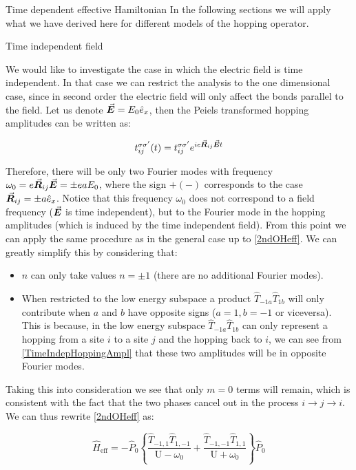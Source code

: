 \begin{section}{Time dependent effective Hamiltonian}
In the following sections we will apply what we have derived here for different models of the hopping operator.

\begin{subsection}{Time independent field}

We would like to investigate the case in which the electric field is time independent. In that case we can restrict the analysis to the one dimensional case, since in second order the electric field will only affect the bonds parallel to the field. Let us denote $\vec{\boldsymbol{E}} = E_0 \hat{e}_x$, then the Peiels transformed hopping amplitudes can be written as:

\begin{equation}
\label{TimeIndepHoppingAmpl}
t_{ij}^{\sigma \sigma'} (t) = t_{ij}^{\sigma \sigma'} e^{ie \vec{\boldsymbol{R}}_{ij} \vec{\boldsymbol{E}} t}
\end{equation}

Therefore, there will be only two Fourier modes with frequency $\omega_0 = e \vec{\boldsymbol{R}}_{ij} \vec{\boldsymbol{E}} = \pm eaE_0$, where the sign $+(-)$ corresponds to the case $\vec{\boldsymbol{R}}_{ij} = \pm a \hat{e}_x$. Notice that this frequency $\omega_0$ does not correspond to a field frequency ($\vec{\boldsymbol{E}}$ is time independent), but to the Fourier mode in the hopping amplitudes (which is induced by the time independent field). From this point we can apply the same procedure as in the general case up to \ref{2ndOHeff}. We can greatly simplify this by considering that:
\begin{itemize}
	\item $n$ can only take values $ n = \pm 1$ (there are no additional Fourier modes).
	\item When restricted to the low energy subspace a product $\hat{T}_{-1 a} \hat{T}_{1 b}$ will only contribute when $a$ and $b$ have opposite signs ($a=1, b=-1$ or viceversa). This is because, in the low energy subspace $\hat{T}_{-1 a} \hat{T}_{1 b}$ can only represent a hopping from a site $i$ to a site $j$ and the hopping back to $i$, we can see from \ref{TimeIndepHoppingAmpl} that these two amplitudes will be in opposite Fourier modes.
\end{itemize}

Taking this into consideration we see that only $m=0$ terms will remain, which is consistent with the fact that the two phases cancel out in the process $i \rightarrow j \rightarrow i$. We can thus rewrite \ref{2ndOHeff} as:

\begin{equation}
\hat{H}_{\text{eff}} = -\hat{P}_0 \left\{ \frac{\hat{T}_{-1,1}\hat{T}_{1,-1} }{\text{U}-\omega_0} + \frac{\hat{T}_{-1,-1}\hat{T}_{1,1} }{\text{U}+\omega_0} \right\} \hat{P}_0
\end{equation}


\end{subsection}
\end{section}
